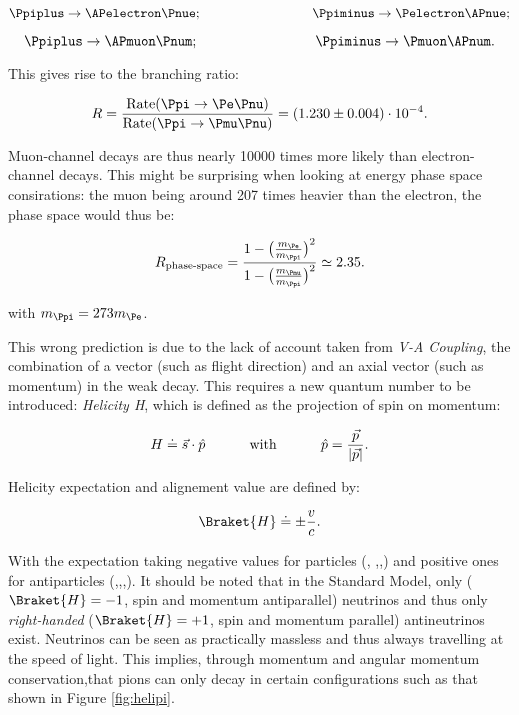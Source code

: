 \begin{equation*}
\Ppiplus \rightarrow \APelectron \Pnue \text{;\hspace{3cm}}\Ppiminus \rightarrow \Pelectron \APnue;
\end{equation*}

\begin{equation*}
\Ppiplus \rightarrow \APmuon \Pnum \text{;\hspace{3cm}}\Ppiminus \rightarrow \Pmuon \APnum.
\end{equation*}

This gives rise to the branching ratio:

\begin{equation}
R=\frac{\text{Rate}(\Ppi\rightarrow \Pe \Pnu)}{\text{Rate}(\Ppi\rightarrow \Pmu \Pnu)} = (1.230 \pm 0.004) \cdot 10^{-4}.
\end{equation}

Muon-channel decays are thus nearly 10000 times more likely than electron-channel decays. This might be surprising when looking at energy phase space consirations: the muon being around 207 times heavier than the electron, the phase space would thus be:

\begin{equation}
R_{\text{phase-space}}=\frac{1-\big(\frac{m_{\Pe}}{m_{\Ppi}}\big)^2}{1-\big(\frac{m_{\Pmu}}{m_{\Ppi}}\big)^2} \simeq 2.35.
\end{equation}

with $m_{\Ppi} = 273 m_{\Pe}$.

This wrong prediction is due to the lack of account taken from \textit{V-A Coupling}, the combination of a vector (such as flight direction) and an axial vector (such as momentum) in the weak decay. This requires a new quantum number to be introduced: \textit{Helicity H}, which is defined as the projection of spin on momentum:

\begin{equation*}
H\doteq \vec{s}\cdot \hat{p} \text{\hspace {1cm} with \hspace{1cm}} \hat{p}=\frac{\vec{p}}{|\vec{p}|}.
\end{equation*}

Helicity  expectation and alignement value are defined by:

\begin{equation*}
\Braket{H}\doteq\pm\frac{v}{c}.
\end{equation*}

With the expectation taking negative values for particles (\Pelectron, \Pmuon,\Pnue,\Pnum) and positive ones for antiparticles (\APelectron,\APmuon,\APnue,\APnum). It should be noted that in the Standard Model, only  ($\Braket{H}=-1$, spin and momentum antiparallel) neutrinos and thus only \textit{right-handed} ($\Braket{H}=+1$, spin and momentum parallel) antineutrinos exist. Neutrinos can be seen as practically massless and thus always travelling at the speed of light. This implies, through momentum and angular momentum conservation,that pions can only decay in certain configurations such as that shown in Figure \ref{fig:helipi}.

